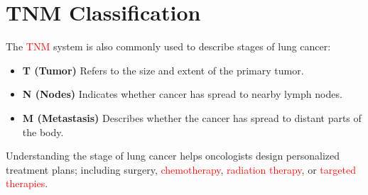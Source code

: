 \section{TNM Classification} 
The \textcolor{red}{TNM} system is also commonly used to describe stages of lung cancer:
\begin{remark}
\begin{itemize}
    \item \textbf{T (Tumor)}  Refers to the size and extent of the primary tumor.
    \item \textbf{N (Nodes)} Indicates whether cancer has spread to nearby lymph nodes.
    \item \textbf{M (Metastasis)} Describes whether the cancer has spread to distant parts of the body.
\end{itemize}
\end{remark}

Understanding the stage of lung cancer helps oncologists design personalized treatment plans; including surgery, \textcolor{red}{chemotherapy}, \textcolor{red}{radiation therapy}, or \textcolor{red}{targeted therapies}.
